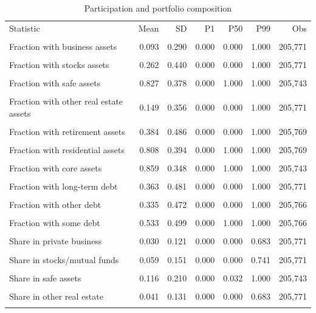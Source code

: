 \begin{table}[htbp]\centering\small
\caption{Participation and portfolio composition}
\label{tab:summary_portfolios}
\begin{tabular}{lrrrrrr}\toprule
Statistic & Mean & SD & P1 & P50 & P99 & Obs \\\\ \midrule
Fraction with business assets & 0.093 & 0.290 & 0.000 & 0.000 & 1.000 & 205,771 \\\\
Fraction with stocks assets & 0.262 & 0.440 & 0.000 & 0.000 & 1.000 & 205,771 \\\\
Fraction with safe assets & 0.827 & 0.378 & 0.000 & 1.000 & 1.000 & 205,743 \\\\
Fraction with other real estate assets & 0.149 & 0.356 & 0.000 & 0.000 & 1.000 & 205,771 \\\\
Fraction with retirement assets & 0.384 & 0.486 & 0.000 & 0.000 & 1.000 & 205,769 \\\\
Fraction with residential assets & 0.808 & 0.394 & 0.000 & 1.000 & 1.000 & 205,769 \\\\
Fraction with core assets & 0.859 & 0.348 & 0.000 & 1.000 & 1.000 & 205,743 \\\\
Fraction with long-term debt & 0.363 & 0.481 & 0.000 & 0.000 & 1.000 & 205,771 \\\\
Fraction with other debt & 0.335 & 0.472 & 0.000 & 0.000 & 1.000 & 205,766 \\\\
Fraction with some debt & 0.533 & 0.499 & 0.000 & 1.000 & 1.000 & 205,766 \\\\
Share in private business & 0.030 & 0.121 & 0.000 & 0.000 & 0.683 & 205,771 \\\\
Share in stocks/mutual funds & 0.059 & 0.151 & 0.000 & 0.000 & 0.741 & 205,771 \\\\
Share in safe assets & 0.116 & 0.210 & 0.000 & 0.032 & 1.000 & 205,743 \\\\
Share in other real estate & 0.041 & 0.131 & 0.000 & 0.000 & 0.683 & 205,771 \\\\

\end{tabular}
\end{table}
